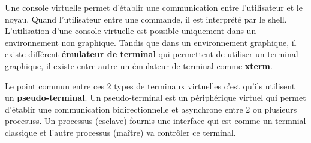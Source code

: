 Une console virtuelle permet d'établir une communication entre l'utilisateur et le noyau. Quand l'utilisateur entre une commande, il est interprété par le shell. L'utilisation d'une console virtuelle est possible uniquement dans un environnement non graphique. 
Tandis que dans un environnement graphique, il existe différent \textbf{émulateur de terminal} qui permettent de utiliser un terminal graphique, il existe entre autre un émulateur de terminal comme \textbf{xterm}.

Le point commun entre ces 2 types de terminaux virtuelles c’est qu’ils utilisent un \textbf{pseudo-terminal}. Un pseudo-terminal est un périphérique virtuel qui permet d’établir une communication bidirectionnelle et asynchrone entre 2 ou plusieurs procesuss. Un processus (esclave) fournis une interface qui est comme un termnial classique et l'autre processus (maître) va contrôler ce terminal.
